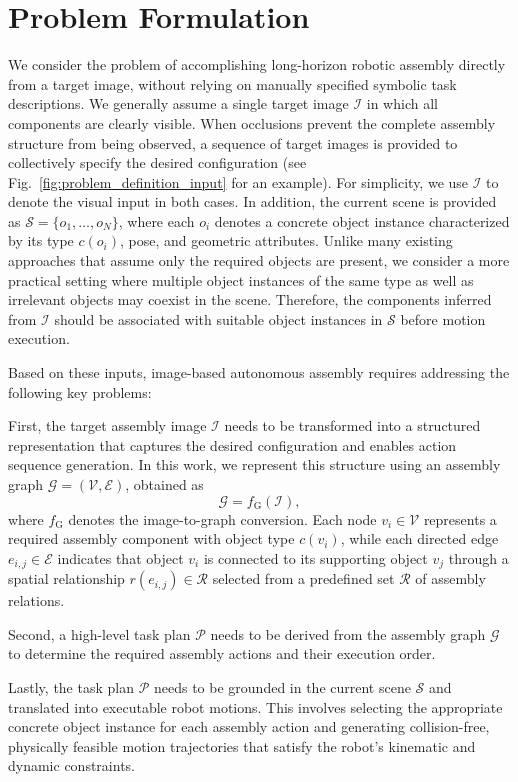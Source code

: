 \documentclass[letterpaper, 10 pt, conference]{ieeeconf}  %
\begin{document}
\section{Problem Formulation}
\label{sec:problem_formulation}

We consider the problem of accomplishing long-horizon robotic assembly directly from a target image, without relying on manually specified symbolic task descriptions. 
We generally assume a single target image $\mathcal{I}$ in which all components are clearly visible. 
When occlusions prevent the complete assembly structure from being observed, a sequence of target images is provided to collectively specify the desired configuration (see Fig.~\ref{fig:problem_definition_input} for an example).  
For simplicity, we use $\mathcal{I}$ to denote the visual input in both cases.
In addition, the current scene is provided as $\mathcal{S}=\{o_1,\dots,o_N\}$, where each $o_i$ denotes a concrete object instance characterized by its type $c(o_i)$, pose, and geometric attributes. 
Unlike many existing approaches that assume only the required objects are present, we consider a more practical setting where multiple object instances of the same type as well as irrelevant objects may coexist in the scene. 
Therefore, the components inferred from $\mathcal{I}$ should be associated with suitable object instances in $\mathcal{S}$ before motion execution.

Based on these inputs, image-based autonomous assembly requires addressing the following key problems:
\begin{compactitem}[$\bullet$]
\item First, the target assembly image $\mathcal{I}$ needs to be transformed into a structured representation that captures the desired configuration and enables action sequence generation. 
In this work, we represent this structure using an assembly graph $\mathcal{G}= (\mathcal{V},\mathcal{E})$, obtained as
\begin{equation}
\mathcal{G} = f_{\mathrm{G}}(\mathcal{I}),
\end{equation}
where $f_{\mathrm{G}}$ denotes the image-to-graph conversion. 
Each node $v_i \in\mathcal{V}$ represents a required assembly component with object type $c(v_i)$, while each directed edge $e_{i,j} \in\mathcal{E}$ indicates that object $v_i$ is connected to its supporting object $v_j$ through a spatial relationship $r(e_{i,j}) \in \mathcal{R}$ selected from a predefined set $\mathcal{R}$ of assembly relations.
\item Second, a high-level task plan $\mathcal{P}$ needs to be derived from the assembly graph $\mathcal{G}$ to determine the required assembly actions and their execution order.
\item Lastly, the task plan $\mathcal{P}$ needs to be grounded in the current scene $\mathcal{S}$ and translated into executable robot motions.  
This involves selecting the appropriate concrete object instance for each assembly action and generating collision-free, physically feasible motion trajectories that satisfy the robot's kinematic and dynamic constraints.
\end{compactitem}
\end{document}
